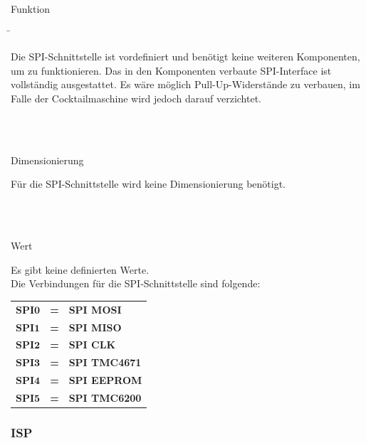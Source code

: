 \begin{tabbing}
\parbox[t]{.25\textwidth}{

Funktion

} \=\parbox[t]{.75\textwidth}{

Die SPI-Schnittstelle ist vordefiniert und benötigt keine weiteren Komponenten, um zu funktionieren. Das in den Komponenten verbaute SPI-Interface ist vollständig ausgestattet. Es wäre möglich Pull-Up-Widerstände zu verbauen, im Falle der Cocktailmaschine wird jedoch darauf verzichtet.

}\\
\\
\parbox[t]{.25\textwidth}{

Dimensionierung

} \>\parbox[t]{.75\textwidth}{

Für die SPI-Schnittstelle wird keine Dimensionierung benötigt.

}\\
\\
\parbox[t]{.25\textwidth}{

Wert

} \>\parbox[t]{.75\textwidth}{

Es gibt keine definierten Werte.\\

Die Verbindungen für die SPI-Schnittstelle sind folgende:

\begin{tabular}{lll}
$\mathbf{SPI0}$ & \textbf{=} &  \textbf{SPI MOSI} \\
$\mathbf{SPI1}$ & \textbf{=} &  \textbf{SPI MISO} \\
$\mathbf{SPI2}$ & \textbf{=} &  \textbf{SPI CLK} \\
$\mathbf{SPI3}$ & \textbf{=} &  \textbf{SPI TMC4671} \\
$\mathbf{SPI4}$ & \textbf{=} &  \textbf{SPI EEPROM} \\
$\mathbf{SPI5}$ & \textbf{=} &  \textbf{SPI TMC6200} \\
\end{tabular}


}
\end{tabbing}

\subsubsection{ISP}\label{subsubsec:ISP_Mikrocontroller}

